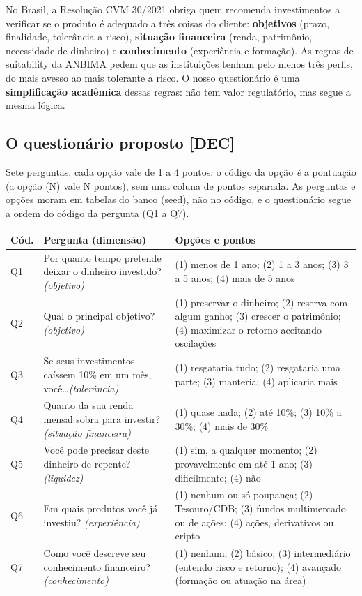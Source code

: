 \documentclass[11pt,a4paper]{article}
\newcommand{\dec}{\textbf{[DEC]}}          %
\begin{document}
No Brasil, a Resolução CVM 30/2021 obriga quem recomenda investimentos a verificar se o produto
é adequado a três coisas do cliente: \textbf{objetivos} (prazo, finalidade, tolerância a risco),
\textbf{situação financeira} (renda, patrimônio, necessidade de dinheiro) e
\textbf{conhecimento} (experiência e formação). As regras de suitability da ANBIMA pedem que as
instituições tenham pelo menos três perfis, do mais avesso ao mais tolerante a risco. O nosso
questionário é uma \textbf{simplificação acadêmica} dessas regras: não tem valor regulatório, mas
segue a mesma lógica.

\subsection{O questionário proposto \dec}

Sete perguntas, cada opção vale de 1 a 4 pontos: o código da opção \emph{é} a pontuação (a opção
(N) vale N pontos), sem uma coluna de pontos separada. As perguntas e opções moram em tabelas do
banco (seed), não no código, e o questionário segue a ordem do código da pergunta (Q1 a Q7).

\begin{longtable}{@{}P{0.9cm}P{4.6cm}P{10.2cm}@{}}
\toprule
\textbf{Cód.} & \textbf{Pergunta (dimensão)} & \textbf{Opções e pontos} \\
\midrule
\endhead
Q1 & Por quanto tempo pretende deixar o dinheiro investido? \emph{(objetivo)} & (1) menos de 1 ano; (2) 1 a 3 anos; (3) 3 a 5 anos; (4) mais de 5 anos \\
Q2 & Qual o principal objetivo? \emph{(objetivo)} & (1) preservar o dinheiro; (2) reserva com algum ganho; (3) crescer o patrimônio; (4) maximizar o retorno aceitando oscilações \\
Q3 & Se seus investimentos caíssem 10\% em um mês, você\ldots \emph{(tolerância)} & (1) resgataria tudo; (2) resgataria uma parte; (3) manteria; (4) aplicaria mais \\
Q4 & Quanto da sua renda mensal sobra para investir? \emph{(situação financeira)} & (1) quase nada; (2) até 10\%; (3) 10\% a 30\%; (4) mais de 30\% \\
Q5 & Você pode precisar deste dinheiro de repente? \emph{(liquidez)} & (1) sim, a qualquer momento; (2) provavelmente em até 1 ano; (3) dificilmente; (4) não \\
Q6 & Em quais produtos você já investiu? \emph{(experiência)} & (1) nenhum ou só poupança; (2) Tesouro/CDB; (3) fundos multimercado ou de ações; (4) ações, derivativos ou cripto \\
Q7 & Como você descreve seu conhecimento financeiro? \emph{(conhecimento)} & (1) nenhum; (2) básico; (3) intermediário (entendo risco e retorno); (4) avançado (formação ou atuação na área) \\
\bottomrule
\end{longtable}
\end{document}
